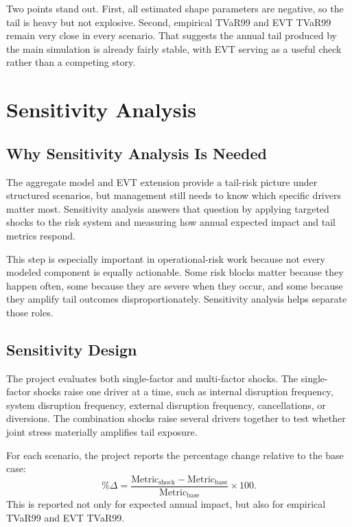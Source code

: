 \documentclass[11pt]{article}
\begin{document}
Two points stand out. First, all estimated shape parameters are negative, so the tail is heavy but not explosive. Second, empirical TVaR99 and EVT TVaR99 remain very close in every scenario. That suggests the annual tail produced by the main simulation is already fairly stable, with EVT serving as a useful check rather than a competing story.

\section{Sensitivity Analysis}

\subsection{Why Sensitivity Analysis Is Needed}
The aggregate model and EVT extension provide a tail-risk picture under structured scenarios, but management still needs to know which specific drivers matter most. Sensitivity analysis answers that question by applying targeted shocks to the risk system and measuring how annual expected impact and tail metrics respond.

This step is especially important in operational-risk work because not every modeled component is equally actionable. Some risk blocks matter because they happen often, some because they are severe when they occur, and some because they amplify tail outcomes disproportionately. Sensitivity analysis helps separate those roles.

\subsection{Sensitivity Design}
The project evaluates both single-factor and multi-factor shocks. The single-factor shocks raise one driver at a time, such as internal disruption frequency, system disruption frequency, external disruption frequency, cancellations, or diversions. The combination shocks raise several drivers together to test whether joint stress materially amplifies tail exposure.

For each scenario, the project reports the percentage change relative to the base case:
\[
\%\Delta = \frac{\text{Metric}_{\text{shock}}-\text{Metric}_{\text{base}}}{\text{Metric}_{\text{base}}}\times 100.
\]
This is reported not only for expected annual impact, but also for empirical TVaR99 and EVT TVaR99.
\end{document}

